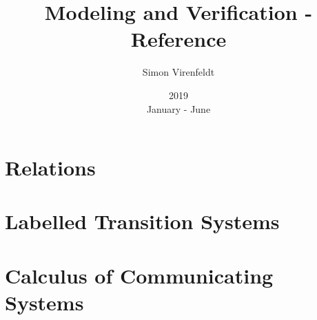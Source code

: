 \documentclass[10pt,a4paper,oneside]{article}
\author{Simon Virenfeldt}
\title{Modeling and Verification - Reference}
\date{2019\\January - June}
\begin{document}
    \maketitle
    \section{Relations}
    
    \section{Labelled Transition Systems}
    
    \section{Calculus of Communicating Systems}
    
\end{document}
